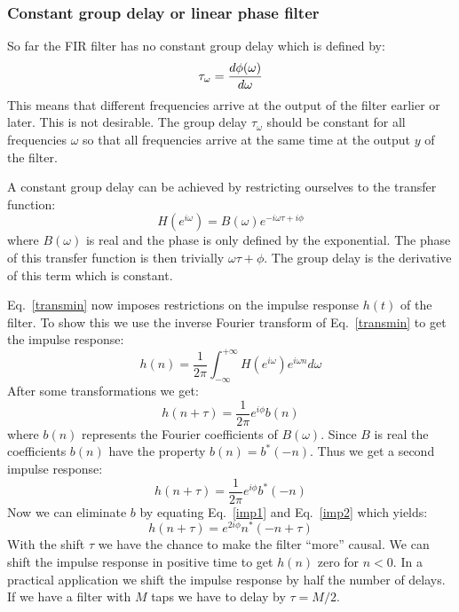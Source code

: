 \documentclass[12pt,a4paper]{article}
\begin{document}
\subsubsection{Constant group delay or linear phase filter}
So far the FIR filter has
no constant group delay which is defined by:
\begin{equation}
\tau_\omega={d\phi(\omega)\over d\omega}
\label{grpdelay}
\end{equation}
This means that different frequencies arrive at the output of the
filter earlier or later. This is not desirable. The group delay
$\tau_\omega$ should be constant for all frequencies $\omega$ so that
all frequencies arrive at the same time at the output $y$ of the
filter.

A constant group delay can be achieved by restricting ourselves to
the transfer function:
\begin{equation}
H(e^{i\omega})=B(\omega)e^{-i\omega\tau+i\phi} \label{transmin}
\end{equation}
where $B(\omega)$ is real and the phase is only defined by the exponential.
The phase of this transfer function is then trivially $\omega\tau+\phi$. The
group delay is the derivative of this term which is constant.

Eq.~\ref{transmin} now imposes restrictions on the impulse response $h(t)$
of the filter. To show this we use the inverse Fourier transform of
Eq.~\ref{transmin} to get the impulse response:
\begin{equation}
h(n)=\frac{1}{2\pi}\int_{-\infty}^{+\infty} H(e^{i\omega})
e^{i\omega n}d \omega
\end{equation}
After some transformations we get:
\begin{equation}
h(n+\tau)=\frac{1}{2\pi}e^{i\phi}b(n) \label{imp1}
\end{equation}
where $b(n)$ represents the Fourier coefficients of $B(\omega)$. Since $B$ is
real the coefficients $b(n)$ have the property $b(n)=b^*(-n)$.
Thus we get a second impulse response:
\begin{equation}
h(n+\tau)=\frac{1}{2\pi}e^{i\phi}b^*(-n) \label{imp2}
\end{equation}
Now we can eliminate $b$ by equating Eq.~\ref{imp1} and Eq.~\ref{imp2} which
yields:
\begin{equation}
h(n+\tau)=e^{2i\phi} n^*(-n+\tau)
\end{equation}
With the shift $\tau$ we have the chance to make the filter ``more''
causal. We can shift the impulse response in positive time to get
$h(n)$ zero for $n<0$. In a practical application we shift the impulse
response by half the number of delays. If we have a filter with $M$
taps we have to delay by $\tau=M/2$.
\end{document}
